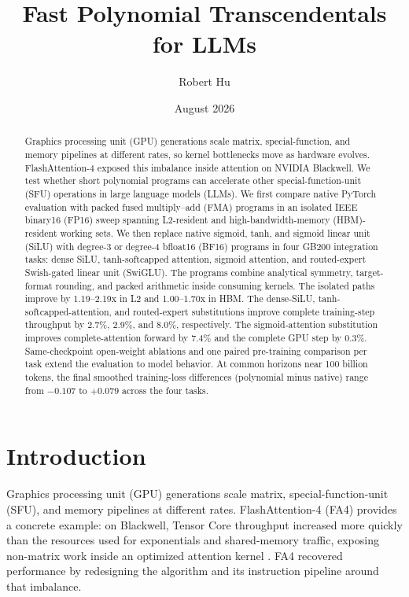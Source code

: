 \documentclass[11pt]{article}
\title{Fast Polynomial Transcendentals for LLMs}
\author{Robert Hu}
\date{August 2026}
\begin{document}
\maketitle

\begin{abstract}
Graphics processing unit (GPU) generations scale matrix, special-function,
and memory pipelines at different rates, so kernel bottlenecks move as hardware
evolves. FlashAttention-4 exposed this imbalance inside attention on NVIDIA
Blackwell. We test whether short polynomial programs can accelerate other
special-function-unit (SFU) operations in large language models (LLMs). We
first compare native PyTorch evaluation with packed fused multiply--add
(FMA) programs in an isolated IEEE binary16 (FP16) sweep spanning L2-resident
and high-bandwidth-memory (HBM)-resident working sets. We then replace native
sigmoid, tanh, and sigmoid linear unit (SiLU) with degree-3 or degree-4
bfloat16 (BF16) programs in four GB200 integration tasks: dense SiLU,
tanh-softcapped attention, sigmoid attention, and routed-expert Swish-gated linear unit
(SwiGLU). The programs combine analytical symmetry, target-format rounding,
and packed arithmetic inside consuming kernels. The isolated paths improve by
1.19--2.19x in L2 and 1.00--1.70x in HBM. The dense-SiLU,
tanh-softcapped-attention, and routed-expert substitutions improve complete
training-step throughput by 2.7\%, 2.9\%, and 8.0\%, respectively. The
sigmoid-attention substitution improves complete-attention forward by 7.4\%
and the complete GPU step by 0.3\%. Same-checkpoint open-weight ablations and
one paired pre-training comparison per task extend the evaluation to model
behavior. At common horizons near 100 billion tokens, the final smoothed
training-loss differences (polynomial minus native) range from $-0.107$ to
$+0.079$ across the four tasks.
\end{abstract}


\section{Introduction}

Graphics processing unit (GPU) generations scale matrix,
special-function-unit (SFU), and memory pipelines at different rates.
FlashAttention-4 (FA4) provides a concrete example: on Blackwell, Tensor Core
throughput increased more quickly than the resources used for exponentials and
shared-memory traffic, exposing non-matrix work inside an optimized attention kernel
\cite{zadouri2026flashattention4}. FA4 recovered performance by redesigning the
algorithm and its instruction pipeline around that imbalance.
\end{document}
